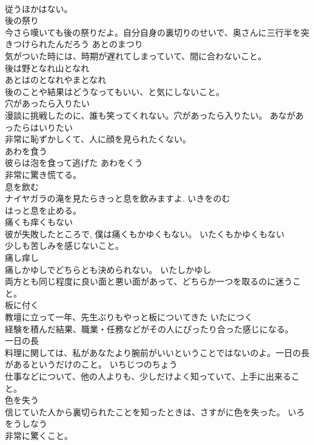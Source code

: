 \documentclass[8pt]{extreport}
\begin{document}
\begin{CJK}{UTF8}{min}
\\	従うほかはない。
\\	後の祭り	
\\	今さら嘆いても後の祭りだよ。自分自身の裏切りのせいで、奥さんに三行半を突きつけられたんだろう	あとのまつり	
\\	気がついた時には、時期が遅れてしまっていて、間に合わないこと。
\\	後は野となれ山となれ	
\\	あとはのとなれやまとなれ	
\\	後のことや結果はどうなってもいい、と気にしないこと。
\\	穴があったら入りたい	
\\	漫談に挑戦したのに、誰も笑ってくれない。穴があったら入りたい。	あながあったらはいりたい	
\\	非常に恥ずかしくて、人に顔を見られたくない。
\\	あわを食う	
\\	彼らは泡を食って逃げた	あわをくう		
\\	非常に驚き慌てる。
\\	息を飲む	
\\	ナイヤガラの滝を見たらきっと息を飲みますよ.	いきをのむ		
\\	はっと息を止める。
\\	痛くも痒くもない	
\\	彼が失敗したところで, 僕は痛くもかゆくもない。	いたくもかゆくもない	
\\	少しも苦しみを感じないこと。
\\	痛し痒し	
\\	痛しかゆしでどちらとも決められない。	いたしかゆし	
\\	両方とも同じ程度に良い面と悪い面があって、どちらか一つを取るのに迷うこと。
\\	板に付く	
\\	教壇に立って一年、先生ぶりもやっと板についてきた	いたにつく		
\\	経験を積んだ結果、職業・任務などがその人にぴったり合った感じになる。
\\	一日の長	
\\	料理に関しては、私があなたより腕前がいいということではないのよ。一日の長があるというだけのこと。	いちじつのちょう		
\\	仕事などについて、他の人よりも、少しだけよく知っていて、上手に出来ること。
\\	色を失う	
\\	信じていた人から裏切られたことを知ったときは、さすがに色を失った。	いろをうしなう		
\\	非常に驚くこと。

\end{CJK}
\end{document}
